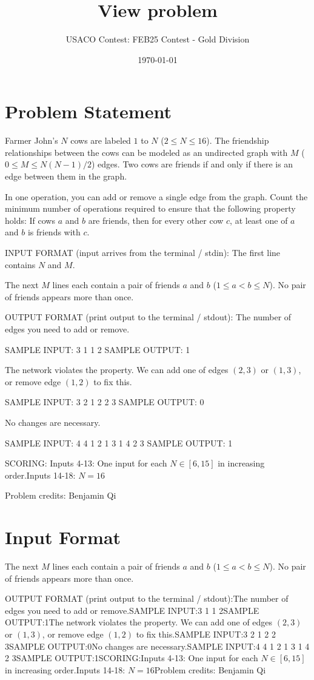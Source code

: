 \documentclass[12pt]{article}
\title{View problem}
\author{USACO Contest: FEB25 Contest - Gold Division}
\date{\today}
\begin{document}
\maketitle

\section*{Problem Statement}


Farmer John's $N$ cows are labeled $1$ to $N$ ($2\le N\le 16$). The friendship
relationships between the cows can be modeled as an undirected graph with $M$
($0\le M\le N(N-1)/2$) edges. Two cows are friends if and only if there is an
edge between them in the graph.

In one operation, you can add or remove a single edge from the graph. Count the
minimum number of operations required to ensure that the following property
holds: If cows $a$ and $b$ are friends, then for every other cow $c$, at least
one of $a$ and $b$ is friends with $c$.

INPUT FORMAT (input arrives from the terminal / stdin):
The first line contains $N$ and $M$.

The next $M$ lines each contain a pair of friends $a$ and $b$ ($1\le a<b\le N$).
No pair of friends appears more than once.

OUTPUT FORMAT (print output to the terminal / stdout):
The number of edges you need to add or remove.

SAMPLE INPUT:
3 1
1 2
SAMPLE OUTPUT: 
1

The network violates the property. We can add one of edges $(2,3)$ or $(1,3)$, 
or remove edge $(1,2)$ to fix this.

SAMPLE INPUT:
3 2
1 2
2 3
SAMPLE OUTPUT: 
0

No changes are necessary.

SAMPLE INPUT:
4 4
1 2
1 3
1 4
2 3
SAMPLE OUTPUT: 
1

SCORING:
Inputs 4-13: One input for each $N\in [6, 15]$ in increasing order.Inputs 14-18: $N=16$


Problem credits: Benjamin Qi



\section*{Input Format}
The next $M$ lines each contain a pair of friends $a$ and $b$ ($1\le a<b\le N$).
No pair of friends appears more than once.

OUTPUT FORMAT (print output to the terminal / stdout):The number of edges you need to add or remove.SAMPLE INPUT:3 1
1 2SAMPLE OUTPUT:1The network violates the property. We can add one of edges $(2,3)$ or $(1,3)$, 
or remove edge $(1,2)$ to fix this.SAMPLE INPUT:3 2
1 2
2 3SAMPLE OUTPUT:0No changes are necessary.SAMPLE INPUT:4 4
1 2
1 3
1 4
2 3SAMPLE OUTPUT:1SCORING:Inputs 4-13: One input for each $N\in [6, 15]$ in increasing order.Inputs 14-18: $N=16$Problem credits: Benjamin Qi
\end{document}
